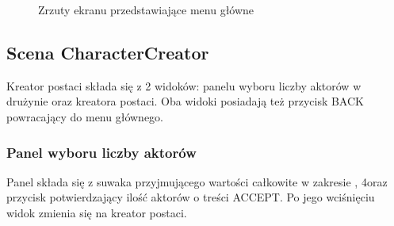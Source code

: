 \documentclass{SGGW-thesis}
\begin{document}
\begin{figure}[H]
  \hfill
  \hfill
  \hfill
  \caption{Zrzuty ekranu przedstawiające menu główne}
\end{figure}
\pagebreak
\subsection{Scena CharacterCreator}
Kreator postaci składa się z 2 widoków: panelu wyboru liczby aktorów w drużynie oraz kreatora postaci. Oba widoki posiadają też przycisk BACK powracający do menu głównego.


\subsubsection{Panel wyboru liczby aktorów}
Panel składa się z suwaka przyjmującego wartości całkowite w zakresie , 4\textrangle oraz przycisk potwierdzający ilość aktorów o treści ACCEPT. Po jego wciśnięciu widok zmienia się na kreator postaci.
\end{document}
